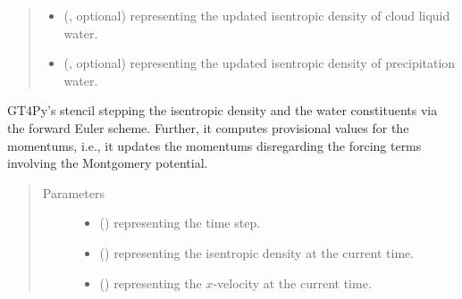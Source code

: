 \documentclass[letterpaper,10pt,english]{sphinxmanual}
\begin{document}
\begin{fulllineitems}
\begin{fulllineitems}
\begin{quote}
\begin{description}
\begin{itemize}
\item {} 
 (, optional) \textendash{}  representing the updated isentropic density of cloud liquid water.

\item {} 
 (, optional) \textendash{}  representing the updated isentropic density of precipitation water.

\end{itemize}


\end{description}\end{quote}

\end{fulllineitems}


\begin{fulllineitems}
\label{\detokenize{api:dycore.prognostic_isentropic_forward_euler.PrognosticIsentropicForwardEuler._stencil_stepping_by_neglecting_vertical_advection_first_defs}}
GT4Py’s stencil stepping the isentropic density and the water constituents via the forward Euler scheme.
Further, it computes provisional values for the momentums, i.e., it updates the momentums disregarding
the forcing terms involving the Montgomery potential.
\begin{quote}\begin{description}
\item[{Parameters}] \leavevmode\begin{itemize}
\item {} 
 () \textendash{}  representing the time step.

\item {} 
 () \textendash{}  representing the isentropic density at the current time.

\item {} 
 () \textendash{}  representing the \(x\)-velocity at the current time.


\end{itemize}
\end{description}
\end{quote}
\end{fulllineitems}
\end{fulllineitems}
\end{document}
